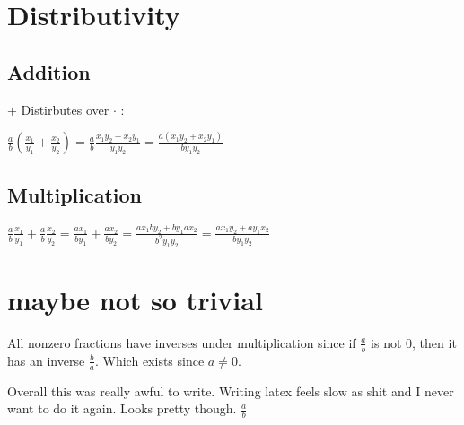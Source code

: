 \documentclass{article}
\begin{document}
\section{Distributivity}

\subsection{Addition}
+ Distirbutes over $\cdot$ :

$
\frac{a}{b} \left(\frac{x_1}{y_1}+\frac{x_2}{y_2}\right) = \frac{a}{b} \frac{x_1 y_2 + x_2 y_1}{y_1 y_2} = \frac{a \left(x_1 y_2 + x_2 y_1\right)}{b y_1 y_2}
$


\subsection{Multiplication}

$
\frac{a}{b} \frac{x_1}{y_1} + \frac{a}{b} \frac{x_2}{y_2} = \frac{a x_1}{b y_1} + \frac{a x_2}{b y_2} = \frac{a x_1 b y_2 + b y_1 a x_2}{b^2 y_1 y_2} = \frac{a x_1 y_2 + a y_1 x_2}{b y_1 y_2}
$

\section{maybe not so trivial}

All nonzero fractions have inverses under multiplication since if $\frac{a}{b}$  is not 0, then it has an inverse $\frac{b}{a}$. Which exists since $a\neq0$.

Overall this was really awful to write. Writing latex feels slow as shit and I  never want to do it again. Looks pretty though. $\frac{a}{b}$


$
$
\end{document}
